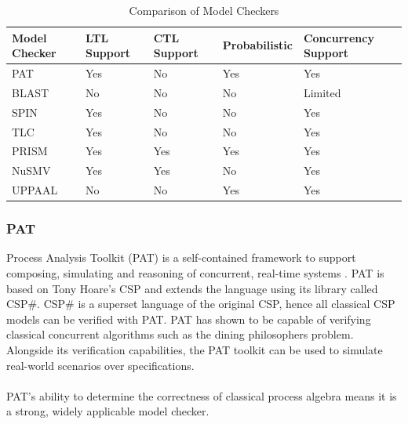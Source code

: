 \begin{table}[ht]
    \centering
    \begin{tabular}{|>{\raggedright\arraybackslash}p{3cm}|
        >{\centering\arraybackslash}p{2cm}|
        >{\centering\arraybackslash}p{2cm}|
        >{\centering\arraybackslash}p{3cm}|
        >{\centering\arraybackslash}p{3cm}|}
        \hline
        \textbf{Model Checker} & \textbf{LTL Support} & \textbf{CTL Support} & \textbf{Probabilistic} & \textbf{Concurrency Support} \\
        \hline
        PAT & Yes & No & Yes & Yes \\
        \hline
        BLAST & No & No & No & Limited \\
        \hline
        SPIN & Yes & No & No & Yes \\
        \hline
        TLC & Yes & No & No & Yes \\
        \hline
        PRISM & Yes & Yes & Yes & Yes \\
        \hline
        NuSMV & Yes & Yes & No & Yes \\
        \hline
        UPPAAL & No & No & Yes & Yes \\
        \hline
    \end{tabular}
    \caption{Comparison of Model Checkers}
    \end{table}
\subsubsection*{\textbf{PAT}}
Process Analysis Toolkit (PAT) is a self-contained framework to support composing, simulating and reasoning of concurrent, real-time systems \cite{pat}. PAT is based on Tony Hoare's CSP and extends the language using its library called CSP\#. CSP\# is a superset language of the original CSP, hence all classical CSP models can be verified with PAT. PAT has shown to be capable of verifying classical concurrent algorithms such as the dining philosophers problem. Alongside its verification capabilities, the PAT toolkit can be used to simulate real-world scenarios over specifications. 
\\ \\
PAT's ability to determine the correctness of classical process algebra means it is a strong, widely applicable model checker.

